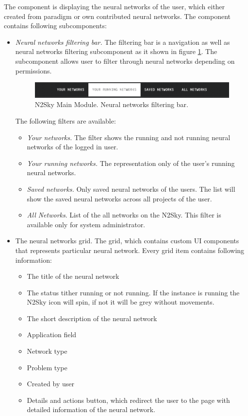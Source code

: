  The component is displaying the neural networks of the user, which either created from paradigm or own contributed neural networks. The component contains following subcomponents:
 \begin{itemize}
\item \emph{Neural networks filtering bar.}
The filtering bar is a navigation as well as neural networks filtering subcomponent as it shown in figure \ref{fig:n2sky_filtering_bar}. The subcomponent allows user to filter through neural networks depending on permissions. 

\begin{figure}[htbp]
\begin{center}
  \includegraphics[scale=0.5]{components/5/img/n2sky_filtering_bar.png}
  \caption{N2Sky Main Module. Neural networks filtering bar.}
  \label{fig:n2sky_filtering_bar}
\end{center}
\end{figure}

The following filters are available: 
\begin{itemize}
\item \emph{Your networks.} The filter shows the running and not running neural networks of the logged in user. 
\item \emph{Your running networks.} The representation only of the user's running neural networks.
\item \emph{Saved networks.} Only saved neural networks of the users. The list will show the saved neural networks across all projects of the user.
\item \emph{All Networks}. List of the all networks on the N2Sky. This filter is available only for system administrator.
\end{itemize}
\item{The neural networks grid.} The grid, which contains custom UI components that represents particular neural network. Every grid item contains following information:
\begin{itemize}
\item The title of the neural network
\item The status tither running or not running. If the instance is running the N2Sky icon will spin, if not it will be grey without movements. 
\item The short description of the neural network
\item Application field
\item Network type
\item Problem type
\item Created by user
\item Details and actions button, which redirect the user to the page with detailed information of the neural network. 
\end{itemize}


\end{itemize}
